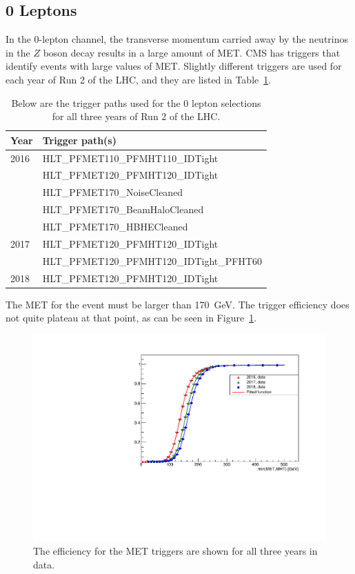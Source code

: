 \subsection{0 Leptons} \label{sec:resolved-0}

In the 0-lepton channel, the transverse momentum carried away by the neutrinos
in the $Z$ boson decay results in a large amount of MET.
CMS has triggers that identify events with large values of MET.
Slightly different triggers are used for each year of Run 2 of the LHC,
and they are listed in Table~\ref{tab:0-triggers}.
\begin{table}
  \centering
  \caption[Triggers for the 0 lepton selection]{
    Below are the trigger paths used for the 0 lepton selections
    for all three years of Run 2 of the LHC.
  }
  \begin{tabular}{|l|l|}
    \hline
    Year & Trigger path(s) \\
    \hline
    2016 & HLT\_PFMET110\_PFMHT110\_IDTight \\
    & HLT\_PFMET120\_PFMHT120\_IDTight \\
    & HLT\_PFMET170\_NoiseCleaned \\
    & HLT\_PFMET170\_BeamHaloCleaned \\
    & HLT\_PFMET170\_HBHECleaned \\
    \hline
    2017 & HLT\_PFMET120\_PFMHT120\_IDTight \\
    & HLT\_PFMET120\_PFMHT120\_IDTight\_PFHT60 \\
    \hline
    2018 & HLT\_PFMET120\_PFMHT120\_IDTight \\
    \hline
  \end{tabular}
  \label{tab:0-triggers}
\end{table}
The MET for the event must be larger than \SI{170}{GeV}.
The trigger efficiency does not quite plateau at that point,
as can be seen in Figure~\ref{fig:0-lep-trigger-eff}.
\begin{figure}
  \centering
  \includegraphics[width=1.0\linewidth]{figures/CompData3Years.pdf}
  \caption[Efficiency for MET trigger in data]{
    The efficiency for the MET triggers are shown for all three years in data.
  }
  \label{fig:0-lep-trigger-eff}
\end{figure}
